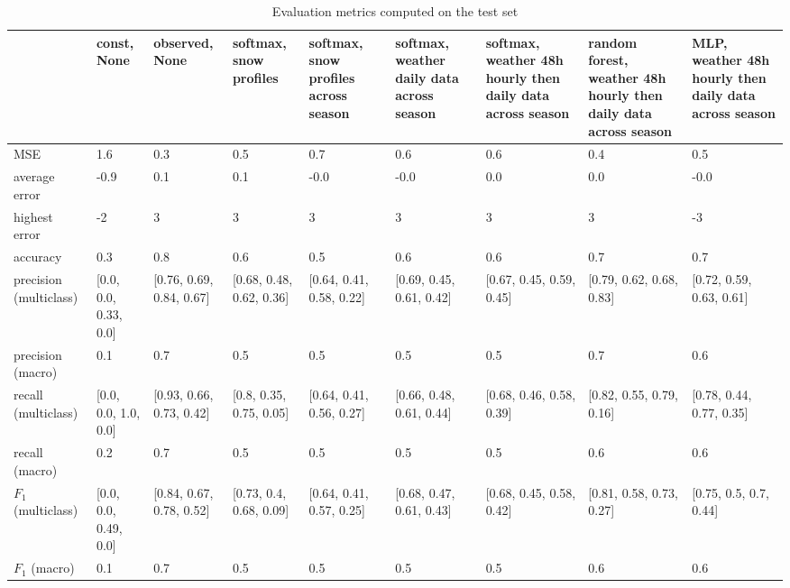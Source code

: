 \begin{table}[H]
\caption{Evaluation metrics computed on the test set}
\label{tbl:sais_eval_test}
\begin{tabular}{lllllllll}
\toprule
 & const, None & observed, None & softmax, snow profiles & softmax, snow profiles across season & softmax, weather daily data across season & softmax, weather 48h hourly then daily data across season & random forest, weather 48h hourly then daily data across season & MLP, weather 48h hourly then daily data across season \\
\midrule
MSE & 1.6 & 0.3 & 0.5 & 0.7 & 0.6 & 0.6 & 0.4 & 0.5 \\
average error & -0.9 & 0.1 & 0.1 & -0.0 & -0.0 & 0.0 & 0.0 & -0.0 \\
highest error & -2 & 3 & 3 & 3 & 3 & 3 & 3 & -3 \\
accuracy & 0.3 & 0.8 & 0.6 & 0.5 & 0.6 & 0.6 & 0.7 & 0.7 \\
precision (multiclass) & [0.0, 0.0, 0.33, 0.0] & [0.76, 0.69, 0.84, 0.67] & [0.68, 0.48, 0.62, 0.36] & [0.64, 0.41, 0.58, 0.22] & [0.69, 0.45, 0.61, 0.42] & [0.67, 0.45, 0.59, 0.45] & [0.79, 0.62, 0.68, 0.83] & [0.72, 0.59, 0.63, 0.61] \\
precision (macro) & 0.1 & 0.7 & 0.5 & 0.5 & 0.5 & 0.5 & 0.7 & 0.6 \\
recall (multiclass) & [0.0, 0.0, 1.0, 0.0] & [0.93, 0.66, 0.73, 0.42] & [0.8, 0.35, 0.75, 0.05] & [0.64, 0.41, 0.56, 0.27] & [0.66, 0.48, 0.61, 0.44] & [0.68, 0.46, 0.58, 0.39] & [0.82, 0.55, 0.79, 0.16] & [0.78, 0.44, 0.77, 0.35] \\
recall (macro) & 0.2 & 0.7 & 0.5 & 0.5 & 0.5 & 0.5 & 0.6 & 0.6 \\
$F_1$ (multiclass) & [0.0, 0.0, 0.49, 0.0] & [0.84, 0.67, 0.78, 0.52] & [0.73, 0.4, 0.68, 0.09] & [0.64, 0.41, 0.57, 0.25] & [0.68, 0.47, 0.61, 0.43] & [0.68, 0.45, 0.58, 0.42] & [0.81, 0.58, 0.73, 0.27] & [0.75, 0.5, 0.7, 0.44] \\
$F_1$ (macro) & 0.1 & 0.7 & 0.5 & 0.5 & 0.5 & 0.5 & 0.6 & 0.6 \\
\bottomrule
\end{tabular}
\end{table}
